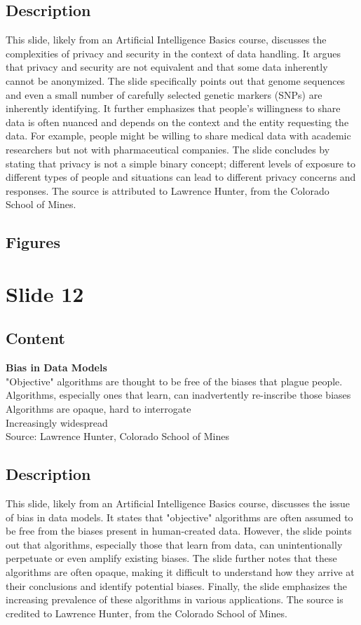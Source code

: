 \documentclass{article}%
\begin{document}
\subsection{Description}%
This slide, likely from an Artificial Intelligence Basics course, discusses the complexities of privacy and security in the context of data handling.  It argues that privacy and security are not equivalent and that some data inherently cannot be anonymized.  The slide specifically points out that genome sequences and even a small number of carefully selected genetic markers (SNPs) are inherently identifying.  It further emphasizes that people's willingness to share data is often nuanced and depends on the context and the entity requesting the data.  For example, people might be willing to share medical data with academic researchers but not with pharmaceutical companies.  The slide concludes by stating that privacy is not a simple binary concept; different levels of exposure to different types of people and situations can lead to different privacy concerns and responses.  The source is attributed to Lawrence Hunter, from the Colorado School of Mines.%
\subsection{Figures}%
\begin{figure}[H]%
\centering%
\end{figure}

%
\newpage%
\section{Slide 12}%
\label{sec:Slide12}%
\subsection{Content}%

\textbf{Bias in Data Models} \\
"Objective" algorithms are thought to be free of the biases that plague people. \\
Algorithms, especially ones that learn, can inadvertently re-inscribe those biases \\
Algorithms are opaque, hard to interrogate \\
Increasingly widespread \\
Source: Lawrence Hunter, Colorado School of Mines
%
\subsection{Description}%
This slide, likely from an Artificial Intelligence Basics course, discusses the issue of bias in data models.  It states that "objective" algorithms are often assumed to be free from the biases present in human-created data. However, the slide points out that algorithms, especially those that learn from data, can unintentionally perpetuate or even amplify existing biases.  The slide further notes that these algorithms are often opaque, making it difficult to understand how they arrive at their conclusions and identify potential biases.  Finally, the slide emphasizes the increasing prevalence of these algorithms in various applications. The source is credited to Lawrence Hunter, from the Colorado School of Mines.%
\end{document}
